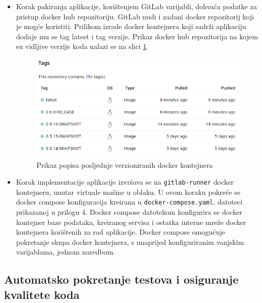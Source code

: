 \documentclass[a4paper,12pt,oneside]{article}
\begin{document}
\begin{itemize}

\item{Korak pakiranja aplikacije, korištenjem GitLab varijabli, dohvaća podatke za pristup docker hub repozitoriju. GitLab nudi i zadani docker repozitorij koji je mogće koristiti. Prilikom izrade docker kontejnera koji sadrži aplikaciju dodaje mu se tag latest i tag verzije. Prikaz docker hub repozitorija na kojem su vidljive verzije koda nalazi se na slici \ref{fig:docker-versions}}. 

\begin{figure}
    \centering
    \includegraphics[width=0.6\linewidth]{Slike/docker-versions.png}
    \caption{Prikaz popisa posljednje verzioniranih docker kontejnera}
    \label{fig:docker-versions}
\end{figure}

\item Korak implementacije aplikacije izvršava se na \texttt{gitlab-runner} docker kontejneru, unutar virtuale mašine u oblaku. U ovom koraku pokreće se docker compose konfiguracija kreirana u \texttt{docker-compose.yaml}, datoteci prikazanoj u prilogu 4. Docker compose datotekom konfigurira se docker kontejner baze podataka, kreiranog servisa i ostatka interne mreže docker kontejnera korištenih za rad aplikacije. Docker compose omogućuje pokretanje skupa docker kontejnera, s unaprijed konfiguriranim vanjskim varijablama, jednom naredbom.




\end{itemize}


\subsection{Automatsko pokretanje testova i osiguranje kvalitete koda}
\end{document}
